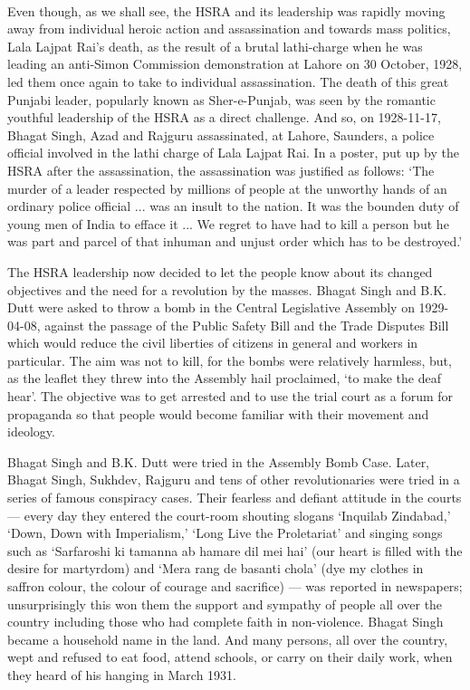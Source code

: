 \begin{multicols}{2}
\paragraph*{}

Even though, as we shall see, the HSRA and its leadership was rapidly moving away from individual heroic action and assassination and towards mass politics, Lala Lajpat Rai's death, as the result of a brutal lathi-charge when he was leading an anti-Simon Commission demonstration at Lahore on 30 October, 1928, led them once again to take to individual assassination. The death of this great Punjabi leader, popularly known as Sher-e-Punjab, was seen by the romantic youthful leadership of the HSRA as a direct challenge. And so, on 1928-11-17, Bhagat Singh, Azad and Rajguru assassinated, at Lahore, Saunders, a police official involved in the lathi charge of Lala Lajpat Rai. In a poster, put up by the HSRA after the assassination, the assassination was justified as follows: `The murder of a leader respected by millions of people at the unworthy hands of an ordinary police official ... was an insult to the nation. It was the bounden duty of young men of India to efface it ... We regret to have had to kill a person but he was part and parcel of that inhuman and unjust order which has to be destroyed.'

The HSRA leadership now decided to let the people know about its changed objectives and the need for a revolution by the masses. Bhagat Singh and B.K. Dutt were asked to throw a bomb in the Central Legislative Assembly on 1929-04-08, against the passage of the Public Safety Bill and the Trade Disputes Bill which would reduce the civil liberties of citizens in general and workers in particular. The aim was not to kill, for the bombs were relatively harmless, but, as the leaflet they threw into the Assembly hail proclaimed, `to make the deaf hear'. The objective was to get arrested and to use the trial court as a forum for propaganda so that people would become familiar with their movement and ideology.

Bhagat Singh and B.K. Dutt were tried in the Assembly Bomb Case. Later, Bhagat Singh, Sukhdev, Rajguru and tens of other revolutionaries were tried in a series of famous conspiracy cases. Their fearless and defiant attitude in the courts --- every day they entered the court-room shouting slogans `Inquilab Zindabad,' `Down, Down with Imperialism,' `Long Live the Proletariat' and singing songs such as `Sarfaroshi ki tamanna ab hamare dil mei hai' (our heart is filled with the desire for martyrdom) and `Mera rang de basanti chola' (dye my clothes in saffron colour, the colour of courage and sacrifice) --- was reported in newspapers; unsurprisingly this won them the support and sympathy of people all over the country including those who had complete faith in non-violence. Bhagat Singh became a household name in the land. And many persons, all over the country, wept and refused to eat food, attend schools, or carry on their daily work, when they heard of his hanging in March 1931.


\end{multicols}

